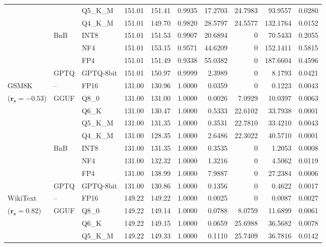\begin{longtable}{ll l rrrrrrr}
 &  & Q5\_K\_M & 151.01 & 151.41 & 0.9935 & 17.2703 & 24.7983 & 93.9557 & 0.0280 \\
 &  & Q4\_K\_M & 151.01 & 149.70 & 0.9820 & 28.5797 & 24.5577 & 132.1764 & 0.0152 \\
 & BnB & INT8 & 151.01 & 151.53 & 0.9907 & 20.6894 & \cellcolor{cyan!12} $0$ & 70.5433 & 0.2055 \\
 &  & NF4 & 151.01 & 153.15 & 0.9571 & 44.6209 & \cellcolor{cyan!12} $0$ & 152.1411 & 0.5815 \\
 &  & FP4 & 151.01 & 151.49 & \cellcolor{red!18} 0.9338 & \cellcolor{red!18} 55.0382 & \cellcolor{cyan!12} $0$ & \cellcolor{red!18} 187.6604 & \cellcolor{red!18} 0.4596 \\
 & GPTQ & GPTQ-8bit & 151.01 & 150.97 & 0.9999 & 2.3989 & \cellcolor{cyan!12} $0$ & 8.1793 & 0.0421 \\
\midrule
GSM8K & -- & FP16 & 131.00 & 130.96 & 1.0000 & 0.0359 & \cellcolor{cyan!12} $0$ & 0.1223 & 0.0043 \\
{\small ($\mathbf{r_s{=}-0.53}$)} & GGUF & Q8\_0 & 131.00 & 131.00 & 1.0000 & 0.0026 & 7.0929 & 10.0397 & 0.0063 \\
 &  & Q6\_K & 131.00 & 130.47 & 1.0000 & 0.5333 & 22.6102 & 33.7938 & 0.0001 \\
 &  & Q5\_K\_M & 131.00 & 131.35 & 1.0000 & 0.3531 & 22.7810 & 33.4210 & 0.0043 \\
 &  & Q4\_K\_M & 131.00 & 128.35 & 1.0000 & 2.6486 & 22.3022 & 40.5710 & 0.0001 \\
 & BnB & INT8 & 131.00 & 131.35 & 1.0000 & 0.3535 & \cellcolor{cyan!12} $0$ & 1.2053 & 0.0008 \\
 &  & NF4 & 131.00 & 132.32 & 1.0000 & 1.3216 & \cellcolor{cyan!12} $0$ & 4.5062 & 0.0119 \\
 &  & FP4 & 131.00 & 138.99 & 1.0000 & 7.9887 & \cellcolor{cyan!12} $0$ & 27.2384 & 0.0006 \\
 & GPTQ & GPTQ-8bit & 131.00 & 130.86 & 1.0000 & 0.1356 & \cellcolor{cyan!12} $0$ & 0.4622 & 0.0017 \\
\midrule
WikiText & -- & FP16 & 149.22 & 149.22 & 1.0000 & 0.0025 & \cellcolor{cyan!12} $0$ & 0.0087 & 0.0027 \\
{\small ($\mathbf{r_s{=}0.82}$)} & GGUF & Q8\_0 & 149.22 & 149.14 & 1.0000 & 0.0788 & 8.0759 & 11.6899 & 0.0061 \\
 &  & Q6\_K & 149.22 & 149.15 & 1.0000 & 0.0659 & 25.6988 & 36.5682 & 0.0078 \\
 &  & Q5\_K\_M & 149.22 & 149.33 & 1.0000 & 0.1110 & 25.7409 & 36.7816 & 0.0142 \\

\end{longtable}
